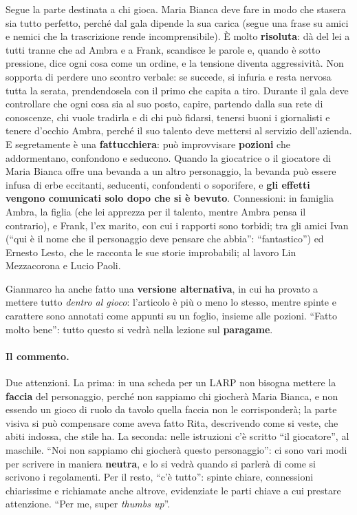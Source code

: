 Segue la parte destinata a chi gioca. Maria Bianca deve fare in modo che stasera
sia tutto perfetto, perché dal gala dipende la sua carica (segue una frase su
amici e nemici che la trascrizione rende incomprensibile). È molto \textbf{risoluta}: dà del lei a tutti
tranne che ad Ambra e a Frank, scandisce le parole e, quando è sotto pressione, dice
ogni cosa come un ordine, e la tensione diventa aggressività. Non sopporta di perdere
uno scontro verbale: se succede, si infuria e resta nervosa tutta la serata,
prendendosela con il primo che capita a tiro. Durante il gala deve controllare che
ogni cosa sia al suo posto, capire, partendo dalla sua rete di conoscenze, chi vuole
tradirla e di chi può fidarsi, tenersi buoni i giornalisti e tenere d'occhio Ambra,
perché il suo talento deve mettersi al servizio dell'azienda. E segretamente è una
\textbf{fattucchiera}: può improvvisare \textbf{pozioni} che addormentano,
confondono e seducono. Quando la giocatrice o il giocatore di Maria Bianca offre una
bevanda a un altro personaggio, la bevanda può essere infusa di erbe eccitanti,
seducenti, confondenti o soporifere, e \textbf{gli effetti vengono comunicati solo
dopo che si è bevuto}. Connessioni: in famiglia Ambra, la figlia (che lei apprezza
per il talento, mentre Ambra pensa il contrario), e Frank, l'ex marito, con cui i
rapporti sono torbidi; tra gli amici Ivan (``qui è il nome che il personaggio deve
pensare che abbia'': ``fantastico'') ed Ernesto Lesto, che le racconta le sue storie
improbabili; al lavoro Lin Mezzacorona e Lucio Paoli.

Gianmarco ha anche fatto una \textbf{versione alternativa}, in cui ha provato a
mettere tutto \emph{dentro al gioco}: l'articolo è più o meno lo stesso, mentre
spinte e carattere sono annotati come appunti su un foglio, insieme alle pozioni.
``Fatto molto bene'': tutto questo si vedrà nella lezione sul \textbf{paragame}.

\paragraph{Il commento.} Due attenzioni. La prima: in una scheda per un LARP non
bisogna mettere la \textbf{faccia} del personaggio, perché non sappiamo chi
giocherà Maria Bianca, e non essendo un gioco di ruolo da tavolo quella faccia non
le corrisponderà; la parte visiva si può compensare come aveva fatto Rita,
descrivendo come si veste, che abiti indossa, che stile ha. La seconda: nelle
istruzioni c'è scritto ``il giocatore'', al maschile. ``Noi non sappiamo chi giocherà
questo personaggio'': ci sono vari modi per scrivere in maniera \textbf{neutra}, e
lo si vedrà quando si parlerà di come si scrivono i regolamenti. Per il resto, ``c'è
tutto'': spinte chiare, connessioni chiarissime e richiamate anche altrove,
evidenziate le parti chiave a cui prestare attenzione. ``Per me, super \emph{thumbs
up}''.

